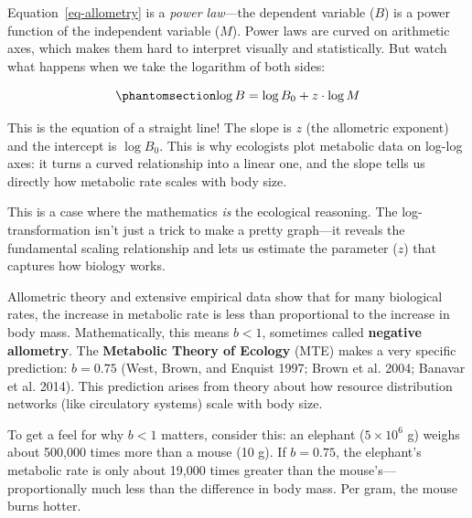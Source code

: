 \documentclass[
  letterpaper,
  DIV=11,
  numbers=noendperiod]{scrreprt}
\begin{document}
\begin{tcolorbox}[enhanced jigsaw, toprule=.15mm, colframe=quarto-callout-note-color-frame, bottomrule=.15mm, arc=.35mm, breakable, leftrule=.75mm, rightrule=.15mm, bottomtitle=1mm, coltitle=black, left=2mm, titlerule=0mm, title={Follow the Logic: Why log-transform?}, toptitle=1mm, colbacktitle=quarto-callout-note-color!10!white, opacityback=0, colback=white, opacitybacktitle=0.6]

Equation~\ref{eq-allometry} is a \emph{power law}---the dependent
variable (\(B\)) is a power function of the independent variable
(\(M\)). Power laws are curved on arithmetic axes, which makes them hard
to interpret visually and statistically. But watch what happens when we
take the logarithm of both sides:

\begin{equation}\phantomsection\label{eq-allometry-log}{\log B = \log B_0 + z \cdot \log M}\end{equation}

This is the equation of a straight line! The slope is \(z\) (the
allometric exponent) and the intercept is \(\log B_0\). This is why
ecologists plot metabolic data on log-log axes: it turns a curved
relationship into a linear one, and the slope tells us directly how
metabolic rate scales with body size.

This is a case where the mathematics \emph{is} the ecological reasoning.
The log-transformation isn't just a trick to make a pretty graph---it
reveals the fundamental scaling relationship and lets us estimate the
parameter (\(z\)) that captures how biology works.

\end{tcolorbox}

Allometric theory and extensive empirical data show that for many
biological rates, the increase in metabolic rate is less than
proportional to the increase in body mass. Mathematically, this means
\(b < 1\), sometimes called \textbf{negative allometry}. The
\textbf{Metabolic Theory of Ecology} (MTE) makes a very specific
prediction: \(b = 0.75\) (West, Brown, and Enquist 1997; Brown et al.
2004; Banavar et al. 2014). This prediction arises from theory about how
resource distribution networks (like circulatory systems) scale with
body size.

To get a feel for why \(b < 1\) matters, consider this: an elephant
(\(5 \times 10^6\) g) weighs about 500,000 times more than a mouse (10
g). If \(b = 0.75\), the elephant's metabolic rate is only about 19,000
times greater than the mouse's---proportionally much less than the
difference in body mass. Per gram, the mouse burns hotter.
\end{document}
